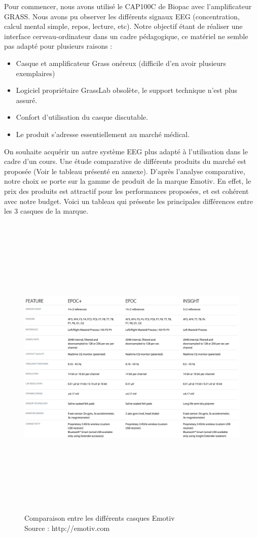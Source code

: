 Pour commencer, nous avons utilisé le CAP100C de Biopac avec l'amplificateur GRASS. Nous avons pu observer les différents signaux EEG (concentration, calcul mental simple, repos, lecture, etc). Notre objectif étant de réaliser une interface cerveau-ordinateur dans un cadre pédagogique, ce matériel ne semble pas adapté pour plusieurs raisons :
\smallbreak
\begin{itemize}
	\item Casque et amplificateur Grass onéreux (difficile d'en avoir plusieurs exemplaires)
	\smallbreak
	\item Logiciel propriétaire GrassLab obsolète, le support technique n'est plus assuré.
	\smallbreak
	\item Confort d'utilisation du casque discutable.
	\smallbreak
	\item Le produit s'adresse essentiellement au marché médical.
\end{itemize}
On souhaite acquérir un autre système EEG plus adapté à l'utilisation dans le cadre d'un cours. Une étude comparative de différents produits du marché est proposée (Voir le tableau présenté en annexe). D'après l'analyse comparative, notre choix se porte sur la gamme de produit de la marque Emotiv. En effet, le prix des produits est attractif pour les performances proposées, et est cohérent avec notre budget. Voici un tableau qui présente les principales différences entre les 3 casques de la marque.

\begin{figure}[h]
	\centering\includegraphics[width=15cm,height=15cm]{images/emotiv_comparaison.png}
	\caption[Comparaison entre les différents casques Emotiv]{Comparaison entre les différents casques Emotiv \\Source : http://emotiv.com}
	\label{fig:Emotiv_Comparaison}
\end{figure}

